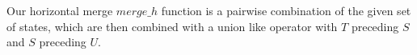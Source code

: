 Our horizontal merge $merge\_h$ function is a pairwise combination of the given set of states, which are then combined with a union like operator with $T$ preceding $S$ and $S$ preceding $U$.
%
%

